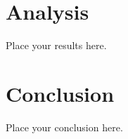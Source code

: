 \documentclass[NOTE, atlasdraft=true, texlive=2016, UKenglish]{\ATLASLATEXPATH atlasdoc}
\begin{document}


\newpage
\section{Analysis}
\label{sec:analysis}

Place your results here.



\newpage
\section{Conclusion}
\label{sec:conclusion}

Place your conclusion here.





\clearpage
{}


\clearpage
\appendix
\end{document}
